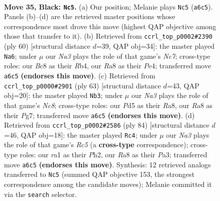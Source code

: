 \documentclass[11pt]{article}
\begin{document}
\clearpage

\begin{figure}[p]\centering
\begin{subfigure}{0.46\textwidth}\centering
\resizebox{\linewidth}{!}{%
\newchessgame
\chessboard[
  setfen={r1bN4/p5k1/n1P1p3/PP1p4/8/2P5/5K2/R1B5 b - - 0 35},
  showmover=false,
  pgfstyle=straightmove, color=movearrow, markmove={a6-c5}
]}
\caption{}
\end{subfigure}\hfill
\begin{subfigure}{0.46\textwidth}\centering
\resizebox{\linewidth}{!}{%
\newchessgame
\chessboard[
  setfen={2rb1k2/2Nn1p2/1B2p1p1/P6p/1R2P3/7P/4K1P1/8 w - - 5 31},
  showmover=false,
  pgfstyle=straightmove, color=movearrow, markmove={c7-a6}
]}
\caption{}
\end{subfigure}
\\[4pt]
\begin{subfigure}{0.46\textwidth}\centering
\resizebox{\linewidth}{!}{%
\newchessgame
\chessboard[
  setfen={r5k1/6pp/4p3/6b1/p5P1/P1N5/1P3B1P/2nR3K b - - 4 32},
  showmover=false,
  pgfstyle=straightmove, color=movearrow, markmove={c1-b3}
]}
\caption{}
\end{subfigure}\hfill
\begin{subfigure}{0.46\textwidth}\centering
\resizebox{\linewidth}{!}{%
\newchessgame
\chessboard[
  setfen={1r4k1/5p2/4p2p/2R1P1p1/n2B4/P4KP1/7P/8 w - - 2 43},
  showmover=false,
  pgfstyle=straightmove, color=movearrow, markmove={c5-c4}
]}
\caption{}
\end{subfigure}
\caption{\textbf{Move 35, Black: \texttt{Nc5}.} (a) Our position; Melanie plays \texttt{Nc5} (\texttt{a6c5}). Panels (b)--(d) are the retrieved master positions whose correspondence most drove this move (highest QAP objective among those that transfer to it). (b) Retrieved from \texttt{ccrl\_top\_p0002\#2390} (ply 60) [structural distance $d$=39, QAP obj=34]: the master played \texttt{Na6}; under $\mu$ our \emph{Na3} plays the role of that game's \emph{Nc7}; cross-type roles: our \emph{B}c8 as their \emph{R}b4, our \emph{R}a8 as their \emph{P}e4; transferred move \texttt{a6c5} \textbf{(endorses this move)}. (c) Retrieved from \texttt{ccrl\_top\_p0000\#2901} (ply 63) [structural distance $d$=43, QAP obj=20]: the master played \texttt{Nb3}; under $\mu$ our \emph{Na3} plays the role of that game's \emph{Nc8}; cross-type roles: our \emph{P}d5 as their \emph{R}a8, our \emph{R}a8 as their \emph{P}g7; transferred move \texttt{a6c5} \textbf{(endorses this move)}. (d) Retrieved from \texttt{ccrl\_top\_p0002\#2586} (ply 84) [structural distance $d$=46, QAP obj=18]: the master played \texttt{Rc4}; under $\mu$ our \emph{Na3} plays the role of that game's \emph{Rc5} (a \textbf{cross-type} correspondence); cross-type roles: our \emph{r}a1 as their \emph{P}h2, our \emph{R}a8 as their \emph{P}a3; transferred move \texttt{a6c5} \textbf{(endorses this move)}. Synthesis: 12 retrieved analogs transferred to \texttt{Nc5} (summed QAP objective 153, the strongest correspondence among the candidate moves); Melanie committed it via the \texttt{search} selector.}
\label{fig:thought-m69}
\end{figure}
\end{document}
